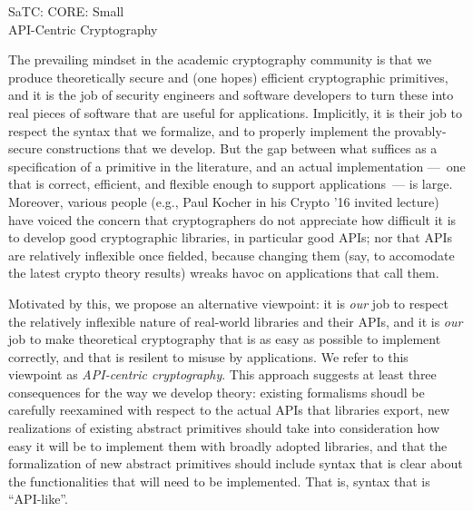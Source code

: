 \documentclass[10pt]{article}
\begin{document}
\thispagestyle{empty}

\begin{center}
{\Large SaTC: CORE: Small }\\ 
{\Large API-Centric Cryptography\\} 
\end{center}

\noindent
The prevailing mindset in the academic cryptography community is that
we produce theoretically secure and (one hopes) efficient
cryptographic primitives, and it is the job of security engineers and
software developers to turn these into real pieces of software that
are useful for applications.  Implicitly, it is their job to respect
the syntax that we formalize, and to properly implement the
provably-secure constructions that we develop.  But
the gap between what suffices as a
specification of a primitive in the literature, and an actual
implementation ---~one that is correct, efficient, and flexible enough
to support applications~--- is large.  Moreover, various 
people (e.g., Paul Kocher in his Crypto '16 invited lecture) have
voiced the concern that cryptographers do not appreciate how
difficult it is to develop good cryptographic libraries, in particular
good APIs; nor that APIs are relatively inflexible once fielded,
because changing them (say, to accomodate the latest crypto theory
results) wreaks havoc on applications that call them.

Motivated by this, we propose an alternative viewpoint: it is
\emph{our} job to respect the relatively inflexible nature of
real-world libraries and their APIs, and it is \emph{our} job to make
theoretical cryptography that is as easy as possible to implement
correctly, and that is resilent to misuse by applications. We refer to this viewpoint as
\emph{API-centric cryptography}.  This approach suggests at least
three consequences for the way we develop theory: existing formalisms
shoudl be carefully reexamined with respect to the actual APIs that
libraries export, new realizations of existing abstract primitives
should take into consideration how easy it will be to implement them
with broadly adopted libraries, and that the formalization of new
abstract primitives should include syntax that is clear about the
functionalities that will need to be implemented.  That is, syntax
that is ``API-like''.
\end{document}

